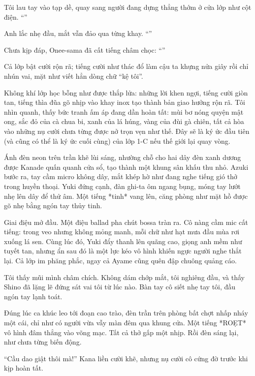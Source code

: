 \documentclass[../main.tex]{subfiles}
\begin{document}
Tôi lau tay vào tạp dề, quay sang người đang dựng thẳng thớm ở cửa lớp như cột điện. ``''

Anh lắc nhẹ đầu, mắt vẫn đảo qua từng khay. ``''

Chưa kịp đáp, Onee-sama đã cất tiếng châm chọc: ``''

Cả lớp bật cười rộn rã; tiếng cười như thác đổ làm cậu ta khựng nửa giây rồi chỉ nhún vai, mặt như viết hẳn dòng chữ ``kệ tôi''.

Không khí lớp học bỗng như được thắp lửa: những lời khen ngợi, tiếng cười giòn tan, tiếng thìa đũa gõ nhịp vào khay inox tạo thành bản giao hưởng rộn rã. Tôi nhìn quanh, thấy bức tranh ấm áp đang dần hoàn tất: mùi bơ nóng quyện mật ong, sắc đỏ của cà chua bi, xanh của lá húng, vàng của đùi gà chiên, tất cả hòa vào những nụ cười chưa từng được nở trọn vẹn như thế. Đây sẽ là ký ức đầu tiên (và cũng có thể là ký ức cuối cùng) của lớp 1-C nếu thế giới lại quay vòng.

Ánh đèn neon trên trần khẽ lùi sáng, nhường chỗ cho hai dây đèn xanh dương được Kanade quấn quanh cửa sổ, tạo thành một khung sân khấu thu nhỏ. Azuki bước ra, tay cầm micro không dây, mắt khép hờ như đang nghe tiếng gió thở trong huyền thoại. Yuki đứng cạnh, đàn ghi-ta ôm ngang bụng, móng tay lướt nhẹ lên dây để thử âm. Một tiếng *tinh* vang lên, căng phòng như mặt hồ được gõ nhẹ bằng ngón tay thủy tinh.

Giai điệu mở đầu. Một điệu ballad pha chút bossa tràn ra. Cô nàng cầm mic cất tiếng: trong veo nhưng không mỏng manh, mỗi chữ như hạt mưa đầu mùa rơi xuống lá sen. Cùng lúc đó, Yuki đẩy thanh lên quãng cao, giọng anh mềm như tuyết tan, nhưng ẩn sau đó là một lực kéo vô hình khiến ngực người nghe thắt lại. Cả lớp im phăng phắc, ngay cả Ayame cũng quên đập chuông quảng cáo.

Tôi thấy mũi mình châm chích. Không dám chớp mắt, tôi nghiêng đầu, và thấy Shino đã lặng lẽ đứng sát vai tôi từ lúc nào. Bàn tay cô siết nhẹ tay tôi, đầu ngón tay lạnh toát.

Đúng lúc ca khúc leo tới đoạn cao trào, đèn trần trên phòng bất chợt nhấp nháy một cái, chỉ như có người vừa vẫy màn đêm qua khung cửa. Một tiếng *ROẸT* vô hình đâm thẳng vào võng mạc. Tất cả thở gấp một nhịp. Rồi đèn sáng lại, như chưa từng biến động.

``Cầu dao giật thôi mà!'' Kana liền cười khẽ, nhưng nụ cười cô cứng đờ trước khi kịp hoàn tất.
\end{document}
